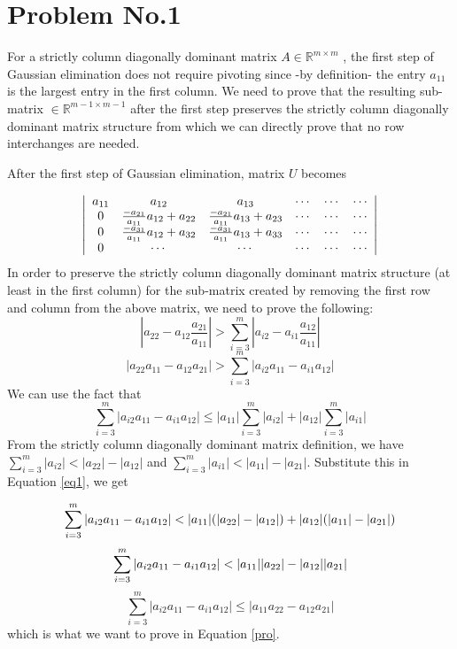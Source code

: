 \section*{Problem No.1} \label{sec:prob1}
For a strictly column diagonally dominant matrix $A \in  \mathbb{R}^{m\times m}$ , the first step of Gaussian elimination does not require pivoting since -by definition- the entry $a_{11}$ is the largest entry in the first column. We need to prove that the resulting sub-matrix $\in  \mathbb{R}^{m-1\times m-1}$ after the first step preserves the strictly column diagonally dominant matrix structure from which we can directly prove that no row interchanges are needed. 

After the first step of Gaussian elimination, matrix $U$ becomes

\[
\left| 
\begin{array}{cc cc cc}
a_{11} & a_{12} & a_{13}  & \cdots  & \cdots  & \cdots\\
0      & \frac{-a_{21}}{a_{11}}a_{12} + a_{22} & \frac{-a_{21}}{a_{11}}a_{13} + a_{23}  & \cdots  & \cdots  & \cdots\\
0      & \frac{-a_{31}}{a_{11}}a_{12} + a_{32} & \frac{-a_{31}}{a_{11}}a_{13} + a_{33}  & \cdots  & \cdots  & \cdots\\
0      & \cdots  & \cdots   & \cdots  & \cdots  & \cdots\\
\end{array} 
\right|
\] 
In order to preserve the strictly column diagonally dominant matrix structure (at least in the first column) for the sub-matrix created by removing the first row and column from the above matrix, we need to prove the following:
\[
|a_{22} - a_{12}\frac{a_{21}}{a_{11}}| > \sum_{i=3}^{m}|a_{i2} -a_{i1}\frac{a_{12}}{a_{11}}|
\]
\begin{equation}
|a_{22}{a_{11}} - a_{12}a_{21}| > \sum_{i=3}^{m}|a_{i2}a_{11} -a_{i1}a_{12}|
\label{pro}
\end{equation}
We can use the fact that
\begin{equation}
\sum_{i=3}^{m}|a_{i2}a_{11} -a_{i1}a_{12}| \leq |a_{11}|\sum_{i=3}^{m}|a_{i2}| + |a_{12}|\sum_{i=3}^{m}|a_{i1}|
\label{eq1}
\end{equation}
From the  strictly column diagonally dominant matrix definition, we have $\sum_{i=3}^{m}|a_{i2}| < |a_{22}|-|a_{12}|$ and  $\sum_{i=3}^{m}|a_{i1}| < |a_{11}|-|a_{21}|$. Substitute this in Equation \ref{eq1}, we get

\[
\sum_{i=3}^{m}|a_{i2}a_{11} -a_{i1}a_{12}| <  |a_{11}|(|a_{22}|-|a_{12}|) + |a_{12}|(|a_{11}|-|a_{21}|)\\
\]
\[
\sum_{i=3}^{m}|a_{i2}a_{11} -a_{i1}a_{12}| <     |a_{11}||a_{22}| - |a_{12}||a_{21}|\\
\]
\[
\sum_{i=3}^{m}|a_{i2}a_{11} -a_{i1}a_{12}| \leq  |a_{11} a_{22} - a_{12} a_{21}|
\]
which is what we want to prove in Equation \ref{pro}.